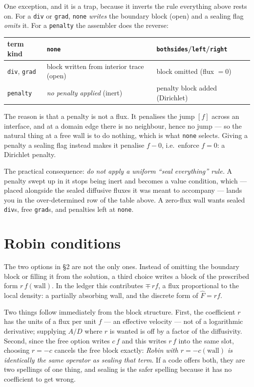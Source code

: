 \documentclass[11pt]{article}
\newcommand{\code}[1]{\texttt{#1}}
\begin{document}
One exception, and it is a trap, because it inverts the rule everything above
rests on. For a \code{div} or \code{grad}, \code{none} \emph{writes} the
boundary block (open) and a sealing flag \emph{omits} it. For a
\code{penalty} the assembler does the reverse:

\begin{center}
\begin{tabular}{@{}lll@{}}
\toprule
term kind & \code{none} & \code{bothsides}/\code{left}/\code{right} \\
\midrule
\code{div}, \code{grad} & block written from interior trace (open) & block omitted (flux $=0$) \\
\code{penalty}          & \emph{no penalty applied} (inert)        & penalty block added (Dirichlet) \\
\bottomrule
\end{tabular}
\end{center}

The reason is that a penalty is not a flux. It penalises the jump $[f]$ across
an interface, and at a domain edge there is no neighbour, hence no jump --- so
the natural thing at a free wall is to do nothing, which is what \code{none}
selects. Giving a penalty a sealing flag instead makes it penalise $f-0$, i.e.\
enforce $f=0$: a Dirichlet penalty.

The practical consequence: \emph{do not apply a uniform ``seal everything''
rule.} A penalty swept up in it stops being inert and becomes a value
condition, which --- placed alongside the sealed diffusive fluxes it was meant
to accompany --- lands you in the over-determined row of the table above. A
zero-flux wall wants sealed \code{div}s, free \code{grad}s, and penalties left
at \code{none}.

\section{Robin conditions}

The two options in \S2 are not the only ones. Instead of omitting the boundary
block or filling it from the solution, a third choice writes a block of the
prescribed form $r\,f(\text{wall})$. In the ledger this contributes
$\mp\, r f$, a flux proportional to the local density: a partially absorbing
wall, and the discrete form of $\widehat F = r f$.

Two things follow immediately from the block structure. First, the coefficient
$r$ has the units of a flux per unit $f$ --- an effective velocity --- not of a
logarithmic derivative; supplying $A/D$ where $r$ is wanted is off by a factor
of the diffusivity. Second, since the free option writes $c\,f$ and this writes
$r\,f$ into the same slot, choosing $r=-c$ cancels the free block exactly:
\emph{Robin with $r=-c(\text{wall})$ is identically the same operator as sealing
that term}. If a code offers both, they are two spellings of one thing, and
sealing is the safer spelling because it has no coefficient to get wrong.
\end{document}
